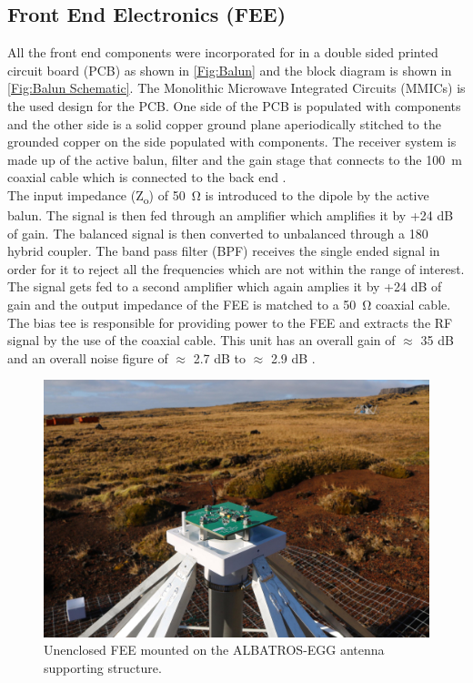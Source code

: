 \documentclass[12pt,a4paper]{report}
\begin{document}
	\subsection{Front End Electronics (FEE)}
	All the front end components were incorporated for in a double sided printed circuit board (PCB) as shown in \autoref{Fig:Balun} and the block diagram is shown in \autoref{Fig:Balun Schematic}. The Monolithic Microwave Integrated Circuits (MMICs) is the used design for the PCB. One side of the PCB is populated with components and the other side is a solid copper ground plane aperiodically stitched to the grounded copper on the side populated with components. The receiver system is made up of the active balun, filter and the gain stage that connects to the \SI{100}{m} coaxial cable which is connected to the back end \cite{2012PASP..124.1090H}.\\ 
	The input impedance (Z\textsubscript{o}) of \SI{50}{\ohm} is introduced to the dipole by the active balun. The signal is then fed through an amplifier which amplifies it by +24 dB of gain. The balanced signal is then converted to unbalanced through a 180 \degree hybrid coupler. The band pass filter (BPF) receives the single ended signal in order for it to reject all the frequencies which are not within the range of interest. The signal gets fed to a second amplifier which again amplies it by +24 dB of gain and the output impedance of the FEE is matched to a \SI{50}{\ohm} coaxial cable. The bias tee is responsible for providing power to the FEE and extracts the RF signal by the use of the coaxial cable. This unit has an overall gain of $\approx$ 35 dB and an overall noise figure of $\approx$ 2.7 dB to $\approx$ 2.9 dB \cite{Memo35}.
	
	\begin{figure}[htb]
		\begin{center}
			\includegraphics[width=1.0\linewidth]{Figures/balun.jpg}
			\caption{Unenclosed FEE mounted on the ALBATROS-EGG antenna supporting structure.} 
			\label{Fig:Balun}
		\end{center}
	\end{figure}
	
\end{document}
